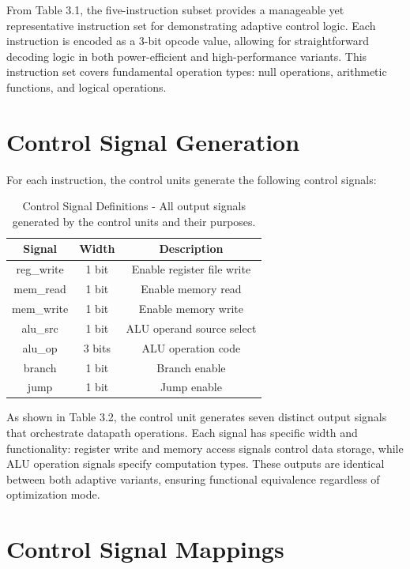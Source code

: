 \documentclass[15pt,a4paper]{report}
\begin{document}
From Table 3.1, the five-instruction subset provides a manageable yet representative instruction set for demonstrating adaptive control logic. Each instruction is encoded as a 3-bit opcode value, allowing for straightforward decoding logic in both power-efficient and high-performance variants. This instruction set covers fundamental operation types: null operations, arithmetic functions, and logical operations.

\section{Control Signal Generation}

For each instruction, the control units generate the following control signals:

\begin{table}[H]
    \centering
    \begin{tabular}{|c|c|c|}
        \hline
        \textbf{Signal} & \textbf{Width} & \textbf{Description} \\
        \hline
        reg\_write & 1 bit & Enable register file write \\
        \hline
        mem\_read & 1 bit & Enable memory read \\
        \hline
        mem\_write & 1 bit & Enable memory write \\
        \hline
        alu\_src & 1 bit & ALU operand source select \\
        \hline
        alu\_op & 3 bits & ALU operation code \\
        \hline
        branch & 1 bit & Branch enable \\
        \hline
        jump & 1 bit & Jump enable \\
        \hline
    \end{tabular}
    \label{tab:ctrl_signals}
    \caption{Control Signal Definitions - All output signals generated by the control units and their purposes.}
\end{table}

As shown in Table 3.2, the control unit generates seven distinct output signals that orchestrate datapath operations. Each signal has specific width and functionality: register write and memory access signals control data storage, while ALU operation signals specify computation types. These outputs are identical between both adaptive variants, ensuring functional equivalence regardless of optimization mode.

\section{Control Signal Mappings}
\end{document}
